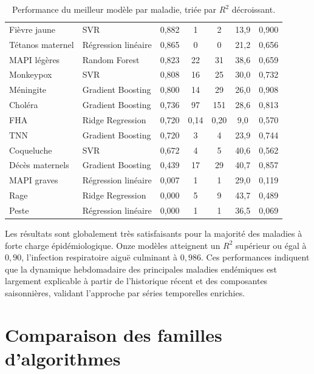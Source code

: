 \begin{table}[htbp]
{\begin{tabular}{|l|l|c|c|c|c|c|}
    Fièvre jaune                 & SVR                 & 0,882 & 1     & 2     & 13,9 & 0,900 \\
    Tétanos maternel             & Régression linéaire & 0,865 & 0     & 0     & 21,2 & 0,656 \\
    MAPI légères                 & Random Forest       & 0,823 & 22    & 31    & 38,6 & 0,659 \\
    Monkeypox                    & SVR                 & 0,808 & 16    & 25    & 30,0 & 0,732 \\
    Méningite                    & Gradient Boosting   & 0,800 & 14    & 29    & 26,0 & 0,908 \\
    Choléra                      & Gradient Boosting   & 0,736 & 97    & 151   & 28,6 & 0,813 \\
    FHA                          & Ridge Regression    & 0,720 & 0,14  & 0,20  & 9,0  & 0,570 \\
    TNN                          & Gradient Boosting   & 0,720 & 3     & 4     & 23,9 & 0,744 \\
    Coqueluche                   & SVR                 & 0,672 & 4     & 5     & 40,6 & 0,562 \\
    Décès maternels              & Gradient Boosting   & 0,439 & 17    & 29    & 40,7 & 0,857 \\
    MAPI graves                  & Régression linéaire & 0,007 & 1     & 1     & 29,0 & 0,119 \\
    Rage                         & Ridge Regression    & 0,000 & 5     & 9     & 43,7 & 0,489 \\
    Peste                        & Régression linéaire & 0,000 & 1     & 1     & 36,5 & 0,069 \\
    \hline
  \end{tabular}%
  }
  \caption{Performance du meilleur modèle par maladie, triée par $R^2$ décroissant.}
  \label{tab:perf-globale}
\end{table}

Les résultats sont globalement très satisfaisants pour la majorité des maladies à
forte charge épidémiologique. Onze modèles atteignent un $R^2$ supérieur ou égal à
$0{,}90$, l'infection respiratoire aiguë culminant à $0{,}986$. Ces performances
indiquent que la dynamique hebdomadaire des principales maladies endémiques est
largement explicable à partir de l'historique récent et des composantes
saisonnières, validant l'approche par séries temporelles enrichies.

\section{Comparaison des familles d'algorithmes}

